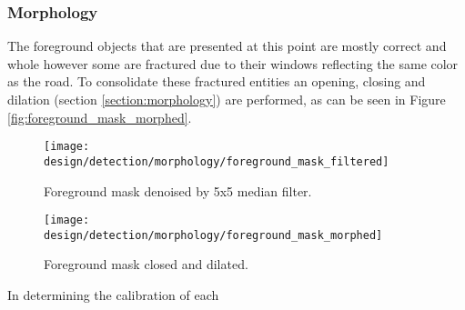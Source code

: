 \subsubsection{Morphology}

The foreground objects that are presented at this point are mostly correct and whole however some are fractured due to their windows reflecting the same color as the road. To consolidate these fractured entities an opening, closing and dilation (section \ref{section:morphology}) are performed, as can be seen in Figure \ref{fig:foreground_mask_morphed}. 

\begin{figure*}[htbp]
    \centering 
    \begin{subfigure}[b]{0.45\textwidth}
        \texttt{[image: design/detection/morphology/foreground\_mask\_filtered]}
        \captionsetup{format = hang}
        \caption{Foreground mask denoised by 5x5 median filter.}
    \end{subfigure}
    \begin{subfigure}[b]{0.45\textwidth}
        \texttt{[image: design/detection/morphology/foreground\_mask\_morphed]}
        \captionsetup{format = hang}
        \caption{Foreground mask closed and dilated.}
    \end{subfigure}
    \captionsetup{format=hang}
    \caption{A foreground mask generated from a traffic scene by OpenCV's GMM implementation.}
    \label{fig:foreground_mask_morphed}
\end{figure*}

In determining the calibration of each 